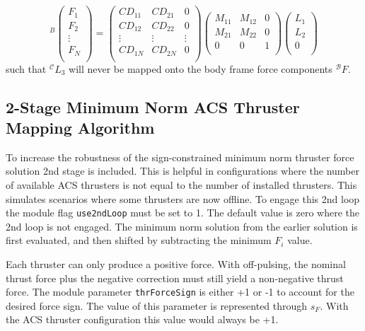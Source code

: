 \begin{equation}
{}^{B}\begin{pmatrix}
 F_1 \\
 F_2 \\
 \vdots \\
 F_N \\
\end{pmatrix} =
\begin{pmatrix}
CD_{11} & CD_{21} & 0 \\
CD_{12} & CD_{22} & 0 \\
\vdots  & \vdots  & \vdots \\
CD_{1N} & CD_{2N} & 0\\
\end{pmatrix}
\begin{pmatrix}
M_{11} & M_{12} & 0 \\
M_{21} & M_{22} & 0 \\
0 & 0 & 1 \\
\end{pmatrix} 
\begin{pmatrix}
 L_1 \\
 L_2 \\
 0 \\
\end{pmatrix} 
\end{equation}
such that ${}^{\mathcal{C}}L_3$ will never be mapped onto the body frame force components ${}^{\mathcal{B}}F$.


\subsection{2-Stage Minimum Norm ACS Thruster Mapping Algorithm}
To increase the robustness of the sign-constrained minimum norm thruster force solution  2nd stage is included.  This is helpful in configurations where the number of available ACS thrusters is not equal to the number of installed thrusters.  This simulates scenarios where some thrusters are now offline.  To engage this 2nd loop the module flag {\tt use2ndLoop} must be set to 1.  The default value is zero where the 2nd loop is not engaged.     The minimum norm solution from the earlier solution is first evaluated, and then shifted by subtracting the minimum $F_{i}$ value.  

Each thruster can only produce a positive force.  With off-pulsing, the nominal thrust force plus the negative correction must still yield a non-negative thrust force.  The module parameter {\tt thrForceSign} is either +1 or -1 to account for the desired force sign.  The value of this parameter is represented through $s_{F}$.  With the ACS thruster configuration this value would always be +1.  

